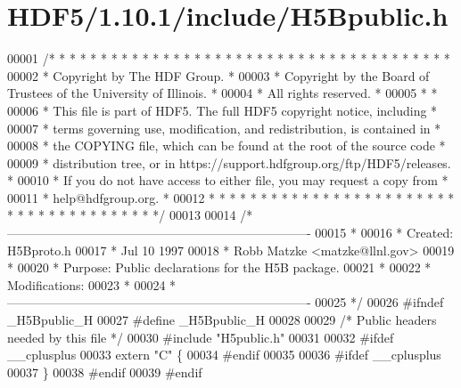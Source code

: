 \hypertarget{_h_d_f5_21_810_81_2include_2_h5_bpublic_8h_source}{}\section{H\+D\+F5/1.10.1/include/\+H5\+Bpublic.h}
\label{_h_d_f5_21_810_81_2include_2_h5_bpublic_8h_source}

\begin{DoxyCode}
00001 \textcolor{comment}{/* * * * * * * * * * * * * * * * * * * * * * * * * * * * * * * * * * * * * * *}
00002 \textcolor{comment}{ * Copyright by The HDF Group.                                               *}
00003 \textcolor{comment}{ * Copyright by the Board of Trustees of the University of Illinois.         *}
00004 \textcolor{comment}{ * All rights reserved.                                                      *}
00005 \textcolor{comment}{ *                                                                           *}
00006 \textcolor{comment}{ * This file is part of HDF5.  The full HDF5 copyright notice, including     *}
00007 \textcolor{comment}{ * terms governing use, modification, and redistribution, is contained in    *}
00008 \textcolor{comment}{ * the COPYING file, which can be found at the root of the source code       *}
00009 \textcolor{comment}{ * distribution tree, or in https://support.hdfgroup.org/ftp/HDF5/releases.  *}
00010 \textcolor{comment}{ * If you do not have access to either file, you may request a copy from     *}
00011 \textcolor{comment}{ * help@hdfgroup.org.                                                        *}
00012 \textcolor{comment}{ * * * * * * * * * * * * * * * * * * * * * * * * * * * * * * * * * * * * * * */}
00013 
00014 \textcolor{comment}{/*-------------------------------------------------------------------------}
00015 \textcolor{comment}{ *}
00016 \textcolor{comment}{ * Created:             H5Bproto.h}
00017 \textcolor{comment}{ *                      Jul 10 1997}
00018 \textcolor{comment}{ *                      Robb Matzke <matzke@llnl.gov>}
00019 \textcolor{comment}{ *}
00020 \textcolor{comment}{ * Purpose:             Public declarations for the H5B package.}
00021 \textcolor{comment}{ *}
00022 \textcolor{comment}{ * Modifications:}
00023 \textcolor{comment}{ *}
00024 \textcolor{comment}{ *-------------------------------------------------------------------------}
00025 \textcolor{comment}{ */}
00026 \textcolor{preprocessor}{#ifndef \_H5Bpublic\_H}
00027 \textcolor{preprocessor}{#define \_H5Bpublic\_H}
00028 
00029 \textcolor{comment}{/* Public headers needed by this file */}
00030 \textcolor{preprocessor}{#include "H5public.h"}
00031 
00032 \textcolor{preprocessor}{#ifdef \_\_cplusplus}
00033 \textcolor{keyword}{extern} \textcolor{stringliteral}{"C"} \{
00034 \textcolor{preprocessor}{#endif}
00035 
00036 \textcolor{preprocessor}{#ifdef \_\_cplusplus}
00037 \}
00038 \textcolor{preprocessor}{#endif}
00039 \textcolor{preprocessor}{#endif}
\end{DoxyCode}
